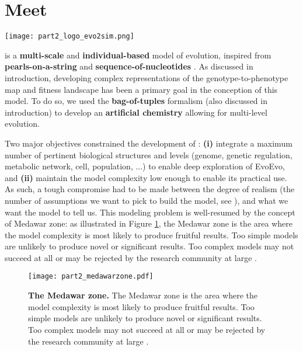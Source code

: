 \section{Meet {\EvoEvoSim}}
\label{sec:part2:methodology:intro}

\begin{figurehere}
\centerline{\texttt{[image: part2\_logo\_evo2sim.png]}}
\caption{{\EvoEvoSim} logo.}
\end{figurehere}

{\EvoEvoSim} is a \textbf{multi-scale} and \textbf{individual-based} model of evolution, inspired from \textbf{pearls-on-a-string} \citep{crombach-hogeweg-2008} and \textbf{sequence-of-nucleotides} \citep{beslon-et-al-2010a,hindre-et-al-2012}.
As discussed in introduction, developing complex representations of the genotype-to-phenotype map and fitness landscape has been a primary goal in the conception of this model. To do so, we used the \textbf{bag-of-tuples} formalism (also discussed in introduction) to develop an  \textbf{artificial chemistry} allowing for multi-level evolution. 

Two major objectives constrained the development of {\EvoEvoSim}: \textbf{(i)} integrate a maximum number of pertinent biological structures and levels (genome, genetic regulation, metabolic network, cell, population, ...) to enable deep exploration of EvoEvo, and \textbf{(ii)} maintain the model complexity low enough to enable its practical use. As such, a tough compromise had to be made between the degree of realism (the number of assumptions we want to pick to build the model, see \citealt{servedio-et-al-2014}), and what we want the model to tell us. This modeling problem is well-resumed by the concept of Medawar zone: as illustrated in Figure \ref{fig:part2:methodology:medawar_zone}, the Medawar zone is the area where the model complexity is most likely to produce fruitful results. Too simple models are unlikely to produce novel or significant results. Too complex models may not succeed at all or may be rejected by the research community at large \citep{loehle-1990}.
\begin{figure}[!ht]
\centering
\texttt{[image: part2\_medawarzone.pdf]}
\caption[The Medawar zone.]{\textbf{The Medawar zone.} The Medawar zone is the area where the model complexity is most likely to produce fruitful results. Too simple models are unlikely to produce novel or significant results. Too complex models may not succeed at all or may be rejected by the research community at large \citep{loehle-1990}.}
\label{fig:part2:methodology:medawar_zone}
\end{figure}

